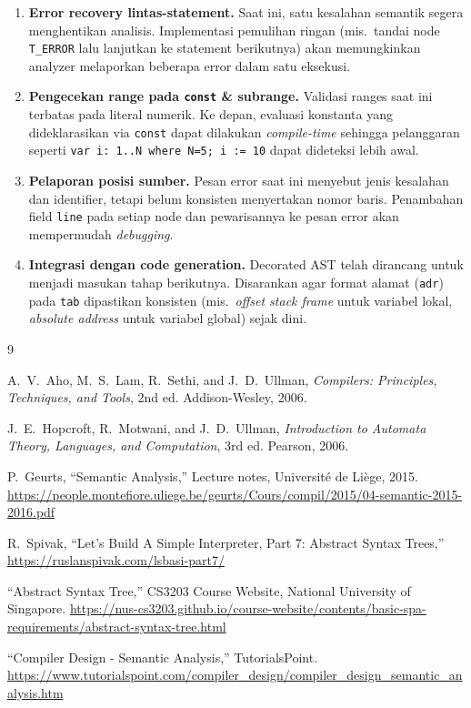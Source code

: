 \documentclass[11pt,a4paper]{article}
\begin{document}
\begin{enumerate}
    \item \textbf{Error recovery lintas-statement.} Saat ini, satu kesalahan
          semantik segera menghentikan analisis. Implementasi pemulihan ringan
          (mis.\ tandai node \texttt{T\_ERROR} lalu lanjutkan ke statement
          berikutnya) akan memungkinkan analyzer melaporkan beberapa error
          dalam satu eksekusi.
    \item \textbf{Pengecekan range pada \texttt{const} \& subrange.} Validasi
          ranges saat ini terbatas pada literal numerik. Ke depan, evaluasi
          konstanta yang dideklarasikan via \texttt{const} dapat dilakukan
          \textit{compile-time} sehingga pelanggaran seperti \texttt{var i:
          1..N where N=5; i := 10} dapat dideteksi lebih awal.
    \item \textbf{Pelaporan posisi sumber.} Pesan error saat ini menyebut
          jenis kesalahan dan identifier, tetapi belum konsisten menyertakan
          nomor baris. Penambahan field \texttt{line} pada setiap node dan
          pewarisannya ke pesan error akan mempermudah \textit{debugging}.
    \item \textbf{Integrasi dengan code generation.} Decorated AST telah
          dirancang untuk menjadi masukan tahap berikutnya. Disarankan agar
          format alamat (\texttt{adr}) pada \texttt{tab} dipastikan konsisten
          (mis.\ \textit{offset stack frame} untuk variabel lokal,
          \textit{absolute address} untuk variabel global) sejak dini.
\end{enumerate}

\newpage
\begin{thebibliography}{9}

A.~V.~Aho, M.~S.~Lam, R.~Sethi, and J.~D.~Ullman,
\textit{Compilers: Principles, Techniques, and Tools}, 2nd ed.
Addison-Wesley, 2006.

J.~E.~Hopcroft, R.~Motwani, and J.~D.~Ullman,
\textit{Introduction to Automata Theory, Languages, and Computation}, 3rd ed.
Pearson, 2006.

P.~Geurts, ``Semantic Analysis,'' Lecture notes, Universit\'e de Li\`ege, 2015.
\url{https://people.montefiore.uliege.be/geurts/Cours/compil/2015/04-semantic-2015-2016.pdf}

R.~Spivak, ``Let's Build A Simple Interpreter, Part 7: Abstract Syntax Trees,''
\url{https://ruslanspivak.com/lsbasi-part7/}

``Abstract Syntax Tree,'' CS3203 Course Website, National University of
Singapore.
\url{https://nus-cs3203.github.io/course-website/contents/basic-spa-requirements/abstract-syntax-tree.html}

``Compiler Design - Semantic Analysis,''
TutorialsPoint.
\url{https://www.tutorialspoint.com/compiler_design/compiler_design_semantic_analysis.htm}

\end{thebibliography}
\end{document}
